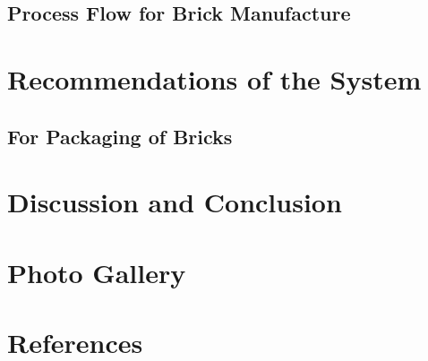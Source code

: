 \documentclass{article}
\begin{document}
\subsection{Process Flow for Brick Manufacture}
\newpage
\section{Recommendations of the System}


\subsection{For Packaging of Bricks}

\section{Discussion and Conclusion}

\section{Photo Gallery}

\section{References}
\end{document}
